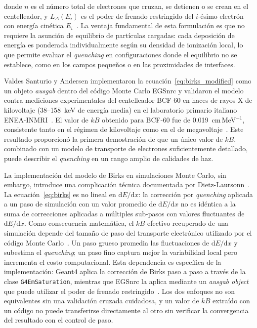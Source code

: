 \documentclass[11pt,a4paper]{article}
\begin{document}
\noindent donde $n$ es el número total de electrones que cruzan, se detienen o se crean en el centelleador, y $L_{\Delta}(E_i)$ es el poder de frenado restringido del $i$-ésimo electrón con energía cinética $E_i$~\cite{santurio2020}. La ventaja fundamental de esta formulación es que no requiere la asunción de equilibrio de partículas cargadas: cada deposición de energía es ponderada individualmente según su densidad de ionización local, lo que permite evaluar el \textit{quenching} en configuraciones donde el equilibrio no se establece, como en los campos pequeños o en las proximidades de interfaces.

Valdes Santurio y Andersen implementaron la ecuación~\eqref{eq:birks_modified} como un objeto \textit{ausgab} dentro del código Monte Carlo EGSnrc y validaron el modelo contra mediciones experimentales del centelleador BCF-60 en haces de rayos X de kilovoltaje (38--158~keV de energía media) en el laboratorio primario italiano ENEA-INMRI~\cite{santurio2020}. El valor de $kB$ obtenido para BCF-60 fue de 0.019~cm\,MeV$^{-1}$, consistente tanto en el régimen de kilovoltaje como en el de megavoltaje~\cite{santurio2019,santurio2020}. Este resultado proporcionó la primera demostración de que un único valor de $kB$, combinado con un modelo de transporte de electrones suficientemente detallado, puede describir el \textit{quenching} en un rango amplio de calidades de haz.

La implementación del modelo de Birks en simulaciones Monte Carlo, sin embargo, introduce una complicación técnica documentada por Dietz-Laursonn~\cite{ebenau2016}. La ecuación~\eqref{eq:birks} es no lineal en $\mathrm{d}E/\mathrm{d}x$: la corrección por \textit{quenching} aplicada a un paso de simulación con un valor promedio de $\mathrm{d}E/\mathrm{d}x$ no es idéntica a la suma de correcciones aplicadas a múltiples sub-pasos con valores fluctuantes de $\mathrm{d}E/\mathrm{d}x$. Como consecuencia matemática, el $kB$ efectivo recuperado de una simulación depende del tamaño de paso del transporte electrónico utilizado por el código Monte Carlo~\cite{ebenau2016}. Un paso grueso promedia las fluctuaciones de $\mathrm{d}E/\mathrm{d}x$ y subestima el \textit{quenching}; un paso fino captura mejor la variabilidad local pero incrementa el costo computacional. Esta dependencia es específica de la implementación: Geant4 aplica la corrección de Birks paso a paso a través de la clase \texttt{G4EmSaturation}, mientras que EGSnrc la aplica mediante un \textit{ausgab object} que puede utilizar el poder de frenado restringido~\cite{santurio2020,ebenau2016}. Los dos enfoques no son equivalentes sin una validación cruzada cuidadosa, y un valor de $kB$ extraído con un código no puede transferirse directamente al otro sin verificar la convergencia del resultado con el control de paso.
\end{document}
